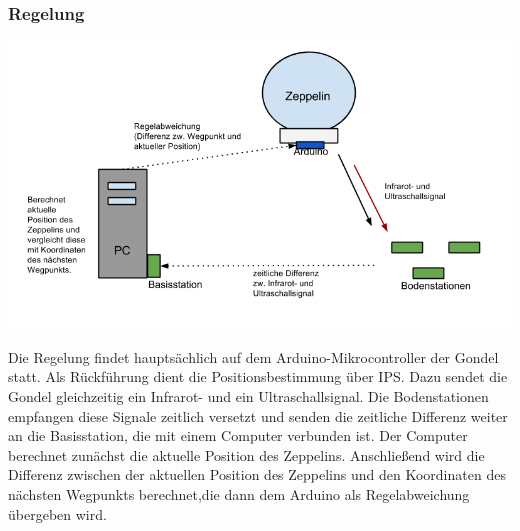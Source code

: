 \documentclass[lang=ngerman,inputenc=utf8,fontsize=10pt]{ldvarticle}
\begin{document}
\subsubsection*{Regelung}
\begin{center}
\includegraphics[width=\textwidth]{Regelung.png}
\end{center}
Die Regelung findet hauptsächlich auf dem Arduino-Mikrocontroller der Gondel statt. Als Rückführung dient die Positionsbestimmung über IPS. Dazu sendet die Gondel gleichzeitig ein Infrarot- und ein Ultraschallsignal. Die Bodenstationen empfangen diese Signale zeitlich versetzt und senden die zeitliche Differenz weiter an die Basisstation, die mit einem Computer verbunden ist. Der Computer berechnet zunächst die aktuelle Position des Zeppelins. Anschließend wird die Differenz zwischen der aktuellen Position des Zeppelins und den Koordinaten des nächsten Wegpunkts berechnet,die dann dem Arduino als Regelabweichung übergeben wird.
\end{document}
